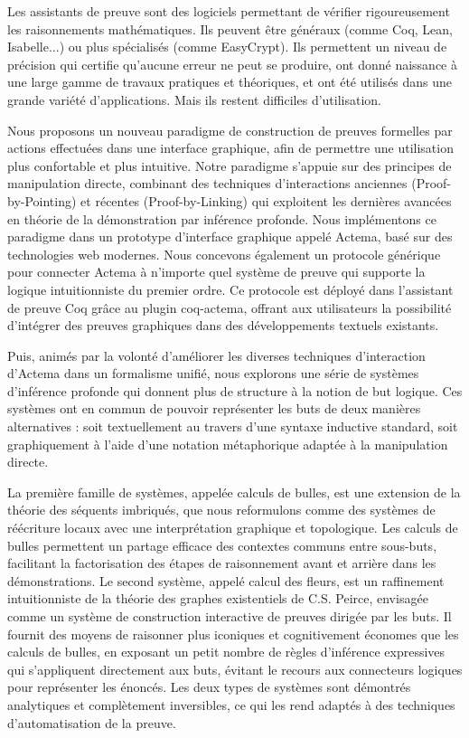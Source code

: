 Les assistants de preuve sont des logiciels permettant de vérifier
rigoureusement les raisonnements mathématiques. Ils peuvent être généraux (comme
Coq, Lean, Isabelle...) ou plus spécialisés (comme EasyCrypt). Ils permettent un
niveau de précision qui certifie qu'aucune erreur ne peut se produire, ont donné
naissance à une large gamme de travaux pratiques et théoriques, et ont été
utilisés dans une grande variété d'applications. Mais ils restent difficiles
d'utilisation.

Nous proposons un nouveau paradigme de construction de preuves formelles par
actions effectuées dans une interface graphique, afin de permettre une
utilisation plus confortable et plus intuitive. Notre paradigme s'appuie sur des
principes de manipulation directe, combinant des techniques d'interactions
anciennes (Proof-by-Pointing) et récentes (Proof-by-Linking) qui exploitent les
dernières avancées en théorie de la démonstration par inférence profonde. Nous
implémentons ce paradigme dans un prototype d'interface graphique appelé Actema,
basé sur des technologies web modernes. Nous concevons également un protocole
générique pour connecter Actema à n'importe quel système de preuve qui supporte
la logique intuitionniste du premier ordre. Ce protocole est déployé dans
l'assistant de preuve Coq grâce au plugin coq-actema, offrant aux utilisateurs
la possibilité d'intégrer des preuves graphiques dans des développements
textuels existants.

Puis, animés par la volonté d'améliorer les diverses techniques d'interaction
d'Actema dans un formalisme unifié, nous explorons une série de systèmes
d'inférence profonde qui donnent plus de structure à la notion de but logique.
Ces systèmes ont en commun de pouvoir représenter les buts de deux manières
alternatives : soit textuellement au travers d'une syntaxe inductive standard,
soit graphiquement à l'aide d'une notation métaphorique adaptée à la
manipulation directe.

La première famille de systèmes, appelée calculs de bulles, est une extension de
la théorie des séquents imbriqués, que nous reformulons comme des systèmes de
réécriture locaux avec une interprétation graphique et topologique. Les calculs
de bulles permettent un partage efficace des contextes communs entre sous-buts,
facilitant la factorisation des étapes de raisonnement avant et arrière dans les
démonstrations. Le second système, appelé calcul des fleurs, est un raffinement
intuitionniste de la théorie des graphes existentiels de C.S. Peirce, envisagée
comme un système de construction interactive de preuves dirigée par les buts. Il
fournit des moyens de raisonner plus iconiques et cognitivement économes que les
calculs de bulles, en exposant un petit nombre de règles d'inférence expressives
qui s'appliquent directement aux buts, évitant le recours aux connecteurs
logiques pour représenter les énoncés. Les deux types de systèmes sont démontrés
analytiques et complètement inversibles, ce qui les rend adaptés à des
techniques d'automatisation de la preuve.

